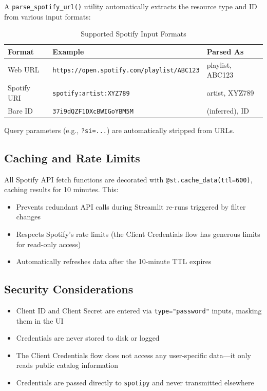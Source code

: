 \documentclass[12pt,a4paper]{article}
\begin{document}
A \texttt{parse\_spotify\_url()} utility automatically extracts the resource type and ID from various input formats:

\begin{table}[H]
\centering
\caption{Supported Spotify Input Formats}
\begin{tabular}{@{}lll@{}}
\toprule
\textbf{Format} & \textbf{Example} & \textbf{Parsed As} \\
\midrule
Web URL     & \texttt{https://open.spotify.com/playlist/ABC123} & playlist, ABC123 \\
Spotify URI & \texttt{spotify:artist:XYZ789}                    & artist, XYZ789 \\
Bare ID     & \texttt{37i9dQZF1DXcBWIGoYBM5M}                   & (inferred), ID \\
\bottomrule
\end{tabular}
\end{table}

Query parameters (e.g., \texttt{?si=...}) are automatically stripped from URLs.

\subsection{Caching and Rate Limits}

All Spotify API fetch functions are decorated with \texttt{@st.cache\_data(ttl=600)}, caching results for 10 minutes. This:

\begin{itemize}[noitemsep]
    \item Prevents redundant API calls during Streamlit re-runs triggered by filter changes
    \item Respects Spotify's rate limits (the Client Credentials flow has generous limits for read-only access)
    \item Automatically refreshes data after the 10-minute TTL expires
\end{itemize}

\subsection{Security Considerations}

\begin{itemize}[noitemsep]
    \item Client ID and Client Secret are entered via \texttt{type="password"} inputs, masking them in the UI
    \item Credentials are never stored to disk or logged
    \item The Client Credentials flow does not access any user-specific data---it only reads public catalog information
    \item Credentials are passed directly to \texttt{spotipy} and never transmitted elsewhere
\end{itemize}
\end{document}
